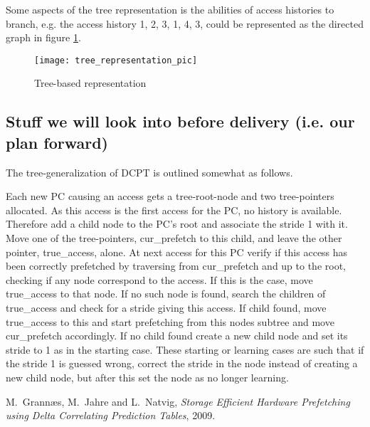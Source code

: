 \documentclass[12pt,journal,compsoc]{IEEEtran}
\begin{document}
Some aspects of the tree representation is the abilities of access histories
to branch, e.g. the access history 1, 2, 3, 1, 4, 3, could be represented
as the directed graph in figure \ref{fig:DG}.

\begin{figure}
\begin{center}
\texttt{[image: tree\_representation\_pic]}
\end{center}
\caption{\label{fig:DG} Tree-based representation}
\end{figure}

\subsection{Stuff we will look into before delivery (i.e. our plan forward)}
The tree-generalization of DCPT is outlined somewhat as follows.

Each new PC
causing an access gets a tree-root-node and two tree-pointers allocated.
As this access is the first access for the PC, no history is available.
Therefore add a child node to the PC's root and associate the stride 1 with it.
Move one of the tree-pointers, cur\_prefetch to this child, and leave the other
pointer, true\_access, alone. At next access for this PC verify if this access
has been correctly prefetched by traversing from cur\_prefetch and up to the
root, checking if any node correspond to the access. If this is the case,
move true\_access to that node. If no such node is found, search the children
of true\_access and check for a stride giving this access. If child found, move
true\_access to this and start prefetching from this nodes subtree and move
cur\_prefetch accordingly. If no child found create a new child node and set
its stride to 1 as in the starting case. These starting or learning cases
are such that if the stride 1 is guessed wrong, correct the stride in the node
instead of creating a new child node, but after this set the node as no longer
learning.

\ifCLASSOPTIONcompsoc
\else
\fi


\ifCLASSOPTIONcaptionsoff
  \newpage
\fi



\begin{thebibliography}{1}

M.~Grann\ae s, M.~Jahre and L.~Natvig, \emph{Storage Efficient Hardware Prefetching using Delta Correlating Prediction Tables}, 2009.

\end{thebibliography}



\end{document}
